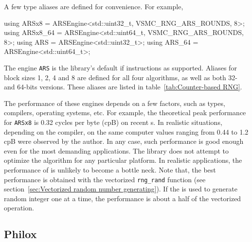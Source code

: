 A few type aliases are defined for convenience. For example,
\begin{cppcode}
  using ARSx8    = ARSEngine<std::uint32_t, VSMC_RNG_ARS_ROUNDS, 8>;
  using ARSx8_64 = ARSEngine<std::uint64_t, VSMC_RNG_ARS_ROUNDS, 8>;
  using ARS      = ARSEngine<std::uint32_t>;
  using ARS_64   = ARSEngine<std::uint64_t>;
\end{cppcode}
The engine \verb|ARS| is the library's default \rng if \aesni instructions as
supported. Aliases for block sizes 1, 2, 4 and 8 are defined for all four
algorithms, as well as both 32- and 64-bits versions. These aliases are listed
in table~\ref{tab:Counter-based RNG}.

The performance of these engines depends on a few factors, such as \cpu types,
compilers, operating systems, etc. For example, the theoretical peak
performance for \verb|ARSx8| is 0.32 cycles per byte (cpB) on recent \cpu{}s.
In realistic situations, depending on the compiler, on the same computer values
ranging from 0.44 to 1.2 cpB were observed by the author. In any case, such
performance is good enough even for the most demanding applications. The
library does not attempt to optimize the algorithm for any particular platform.
In realistic applications, the performance of \rng is unlikely to become a
bottle neck. Note that, the best performance is obtained with the vectorized
\verb|rng_rand| function (see section~\ref{sec:Vectorized random number
  generating}). If the \rng{} is used to generate random integer one at a time,
the performance is about a half of the vectorized operation.

\subsection{Philox}
\label{sub:Philox}

